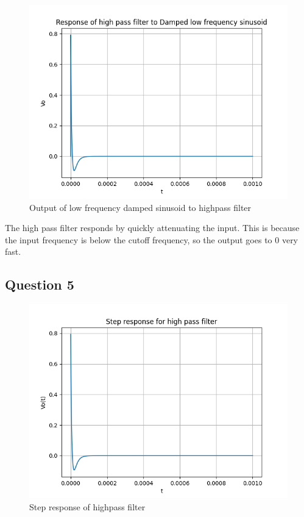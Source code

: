 \documentclass[11pt, a4paper]{article}
\begin{document}
\begin{figure}[!tbh]
\centering
\includegraphics[scale=0.5]{assgn8_plot7.png} 
\caption{Output of low frequency damped sinusoid to highpass filter}
\label{fig7}
\end{figure}

The high pass filter responds by quickly attenuating the input. This is because the input frequency is below the cutoff frequency, so the output goes to 0 very fast.


\subsection*{Question 5}

\begin{figure}[!tbh]
\centering
\includegraphics[scale=0.5]{assgn8_plot8.png} 
\caption{Step response of highpass filter}
\label{fig8}
\end{figure}
\end{document}
